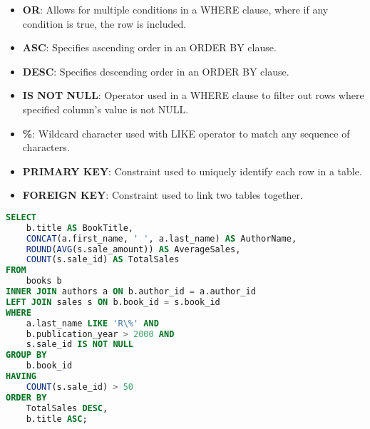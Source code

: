 \begin{itemize}[noitemsep,leftmargin=*]
    \item \textbf{OR}: Allows for multiple conditions in a WHERE clause, where if any condition is true, the row is included.
    \item \textbf{ASC}: Specifies ascending order in an ORDER BY clause.
    \item \textbf{DESC}: Specifies descending order in an ORDER BY clause.
    \item \textbf{IS NOT NULL}: Operator used in a WHERE clause to filter out rows where specified column's value is not NULL.
    \item \textbf{\%}: Wildcard character used with LIKE operator to match any sequence of characters.
    \item \textbf{PRIMARY KEY}: Constraint used to uniquely identify each row in a table.
    \item \textbf{FOREIGN KEY}: Constraint used to link two tables together.
\end{itemize}

\begin{lstlisting}[language=SQL]
SELECT 
    b.title AS BookTitle, 
    CONCAT(a.first_name, ' ', a.last_name) AS AuthorName, 
    ROUND(AVG(s.sale_amount)) AS AverageSales,
    COUNT(s.sale_id) AS TotalSales
FROM 
    books b
INNER JOIN authors a ON b.author_id = a.author_id
LEFT JOIN sales s ON b.book_id = s.book_id
WHERE 
    a.last_name LIKE 'R\%' AND
    b.publication_year > 2000 AND
    s.sale_id IS NOT NULL
GROUP BY 
    b.book_id
HAVING 
    COUNT(s.sale_id) > 50
ORDER BY 
    TotalSales DESC, 
    b.title ASC;
\end{lstlisting}

